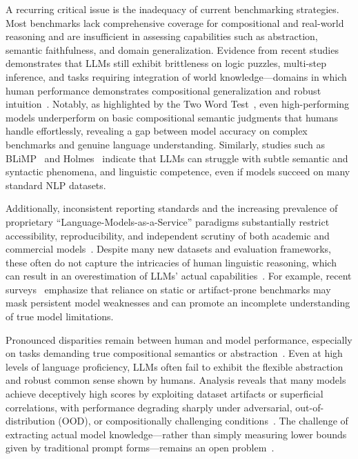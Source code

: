 \documentclass[sigconf]{acmart}
\begin{document}
A recurring critical issue is the inadequacy of current benchmarking strategies. Most benchmarks lack comprehensive coverage for compositional and real-world reasoning and are insufficient in assessing capabilities such as abstraction, semantic faithfulness, and domain generalization. Evidence from recent studies demonstrates that LLMs still exhibit brittleness on logic puzzles, multi-step inference, and tasks requiring integration of world knowledge---domains in which human performance demonstrates compositional generalization and robust intuition~\cite{ref10,ref17,ref18,ref19,ref31,ref32,ref34,ref44,ref79,ref98,ref96,ref99,ref92}. Notably, as highlighted by the Two Word Test~\cite{ref96}, even high-performing models underperform on basic compositional semantic judgments that humans handle effortlessly, revealing a gap between model accuracy on complex benchmarks and genuine language understanding. Similarly, studies such as BLiMP~\cite{ref99} and Holmes~\cite{ref97} indicate that LLMs can struggle with subtle semantic and syntactic phenomena, and linguistic competence, even if models succeed on many standard NLP datasets. 

Additionally, inconsistent reporting standards and the increasing prevalence of proprietary ``Language-Models-as-a-Service'' paradigms substantially restrict accessibility, reproducibility, and independent scrutiny of both academic and commercial models~\cite{ref7,ref13,ref34,ref47,ref52,ref106,ref107,ref108}. Despite many new datasets and evaluation frameworks, these often do not capture the intricacies of human linguistic reasoning, which can result in an overestimation of LLMs' actual capabilities~\cite{ref44,ref77,ref79,ref98,ref99,ref102,ref103}. For example, recent surveys~\cite{ref10,ref55,ref56,ref44} emphasize that reliance on static or artifact-prone benchmarks may mask persistent model weaknesses and can promote an incomplete understanding of true model limitations.

Pronounced disparities remain between human and model performance, especially on tasks demanding true compositional semantics or abstraction~\cite{ref31,ref32,ref44,ref96,ref98,ref99,ref97,ref92}. Even at high levels of language proficiency, LLMs often fail to exhibit the flexible abstraction and robust common sense shown by humans. Analysis reveals that many models achieve deceptively high scores by exploiting dataset artifacts or superficial correlations, with performance degrading sharply under adversarial, out-of-distribution (OOD), or compositionally challenging conditions~\cite{ref55,ref77,ref98}. The challenge of extracting actual model knowledge---rather than simply measuring lower bounds given by traditional prompt forms---remains an open problem~\cite{ref98}.
\end{document}
